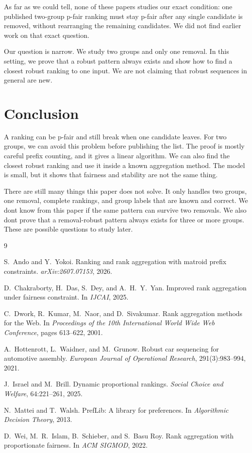\documentclass[11pt]{article}
\begin{document}
As far as we could tell, none of these papers studies our exact condition:
one published two-group p-fair ranking must stay p-fair after any single
candidate is removed, without rearranging the remaining candidates.  We did
not find earlier work on that exact question.

Our question is narrow.  We study two groups and only one removal.  In this
setting, we prove that a robust pattern always exists and show how to find a
closest robust ranking to one input.  We are not claiming that robust
sequences in general are new.

\section{Conclusion}

A ranking can be p-fair and still break when one candidate leaves.  For two
groups, we can avoid this problem before publishing the list.  The proof is
mostly careful prefix counting, and it gives a linear algorithm.  We can also
find the closest robust ranking and use it inside a known aggregation method.
The model is small, but it shows that fairness and stability are not the same
thing.

There are still many things this paper does not solve.  It only handles two
groups, one removal, complete rankings, and group labels that are known and
correct.  We dont know from this paper if the same pattern can survive two
removals.  We also dont prove that a removal-robust pattern always exists for
three or more groups.  These are possible questions to study later.

\begin{thebibliography}{9}

S.~Ando and Y.~Yokoi.
Ranking and rank aggregation with matroid prefix constraints.
\emph{arXiv:2607.07153}, 2026.

D.~Chakraborty, H.~Das, S.~Dey, and A.~H.~Y.~Yan.
Improved rank aggregation under fairness constraint.
In \emph{IJCAI}, 2025.

C.~Dwork, R.~Kumar, M.~Naor, and D.~Sivakumar.
Rank aggregation methods for the Web.
In \emph{Proceedings of the 10th International World Wide Web Conference},
pages 613--622, 2001.

A.~Hottenrott, L.~Waidner, and M.~Grunow.
Robust car sequencing for automotive assembly.
\emph{European Journal of Operational Research}, 291(3):983--994, 2021.

J.~Israel and M.~Brill.
Dynamic proportional rankings.
\emph{Social Choice and Welfare}, 64:221--261, 2025.

N.~Mattei and T.~Walsh.
PrefLib: A library for preferences.
In \emph{Algorithmic Decision Theory}, 2013.

D.~Wei, M.~R.~Islam, B.~Schieber, and S.~Basu Roy.
Rank aggregation with proportionate fairness.
In \emph{ACM SIGMOD}, 2022.

\end{thebibliography}
\end{document}

